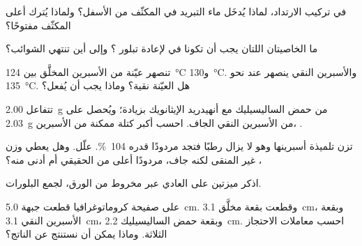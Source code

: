 \begin{exercise}[$\star$]\label{exo:g10:synthesis-yield:3}
في تركيب الارتداد، لماذا يُدخَل ماء التبريد في المكثّف من الأسفل؟ ولماذا
يُترك أعلى المكثّف مفتوحًا؟
\end{exercise}

\begin{exercise}[$\star$]\label{exo:g10:synthesis-yield:4}
ما الخاصيتان اللتان يجب أن تكونا في  لإعادة تبلور ؟ وإلى أين تنتهي
الشوائب؟
\end{exercise}

\begin{exercise}[$\star$]\label{exo:g10:synthesis-yield:5}
تنصهر عيّنة من الأسبرين المخلَّق بين \qty{124}{\celsius}
و\qty{130}{\celsius}. والأسبرين النقي ينصهر عند نحو \qty{135}{\celsius}. هل
العيّنة نقية؟ وماذا يجب أن يُفعل؟
\end{exercise}

\begin{exercise}[$\star\star$]\label{exo:g10:synthesis-yield:6}
تتفاعل \qty{2.00}{g} من حمض الساليسيليك مع أنهيدريد الإيثانويك بزيادة؛ ويُحصل
على \qty{2.03}{g} من الأسبرين النقي الجاف. احسب أكبر كتلة ممكنة من الأسبرين،
.
\end{exercise}

\begin{exercise}[$\star\star$]\label{exo:g10:synthesis-yield:7}
تزن تلميذة أسبرينها وهو لا يزال رطبًا فتجد مردودًا قدره
\qty{104}{\percent}. علّل. وهل يعطي وزن ، غير المنقى لكنه جاف،
مردودًا أعلى من  الحقيقي أم أدنى منه؟
\end{exercise}

\begin{exercise}[$\star\star$]\label{exo:g10:synthesis-yield:8}
اذكر ميزتين  على  العادي عبر مخروط من الورق،
لجمع البلورات.
\end{exercise}

\begin{exercise}[$\star\star$]\label{exo:g10:synthesis-yield:9}
على صفيحة كروماتوغرافيا قطعت جبهة  \qty{5.0}{cm}. وقطعت بقعة  مخلَّق
\qty{3.1}{cm}، وبقعة الأسبرين النقي \qty{3.1}{cm}، وبقعة حمض الساليسيليك
\qty{2.2}{cm}. احسب معاملات الاحتجاز الثلاثة. وماذا يمكن أن نستنتج عن
الناتج؟
\end{exercise}

